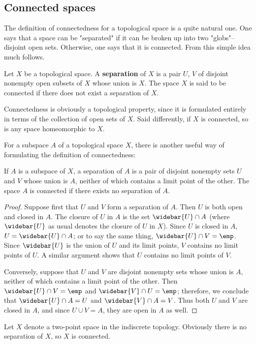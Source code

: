\subsection{Connected spaces}
The definition of connectedness for a topological space is a quite natural one. One says that a space can be "separated" if it can be broken up into two "globs"--disjoint open sets. Otherwise, one says that it is connected. From this simple idea much follows.
\begin{definition}
Let $X$ be a topological space. A \textbf{separation} of $X$ is a pair $U$, $V$ of disjoint nonempty open subsets of $X$ whose union is $X$. The space $X$ is said to be connected if there does not exist a separation of $X$.
\end{definition}
Connectedness is obviously a topological property, since it is formulated entirely in terms of the collection of open sets of $X$. Said differently, if $X$ is connected, so is any space homeomorphic to $X$.\par
For a subspace $A$ of a topological space $X$, there is another useful way of formulating the definition of connectedness:
\begin{lemma}\label{topo space connectedness of subspace}
If $A$ is a subspace of $X$, a separation of $A$ is a pair of disjoint nonempty sets $U$ and $V$ whose union is $A$, neither of which contains a limit point of the other. The space $A$ is connected if there exists no separation of $A$.
\end{lemma}
\begin{proof}
Suppose first that $U$ and $V$ form a separation of $A$. Then $U$ is both open and closed in $A$. The closure of $U$ in $A$ is the set $\widebar{U}\cap A$ (where $\widebar{U}$ as usual denotes the closure of $U$ in $X$). Since $U$ is closed in $A$, $U=\widebar{U}\cap A$; or to say the same thing, $\widebar{U}\cap V=\emp$. Since $\widebar{U}$ is the union of $U$ and its limit points, $V$ contains no limit points of $U$. A similar argument shows that $U$ contains no limit points of $V$.\par
Conversely, suppose that $U$ and $V$ are disjoint nonempty sets whose union is $A$, neither of which contains a limit point of the other. Then $\widebar{U}\cap V=\emp$ and $\widebar{V}\cap U=\emp$; therefore, we conclude that $\widebar{U}\cap A=U$ and $\widebar{V}\cap A=V$. Thus both $U$ and $V$ are closed in $A$, and since $U\cup V=A$, they are open in $A$ as well.
\end{proof}
\begin{example}
Let $X$ denote a two-point space in the indiscrete topology. Obviously there is no separation of $X$, so $X$ is connected.
\end{example}
